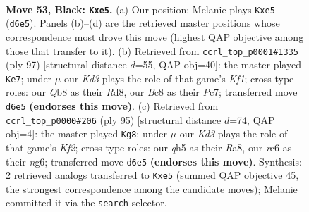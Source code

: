 \documentclass[11pt]{article}
\begin{document}
\clearpage

\begin{figure}[p]\centering
\begin{subfigure}{0.46\textwidth}\centering
\resizebox{\linewidth}{!}{%
\newchessgame
\chessboard[
  setfen={1qb5/r7/2Rkp3/p2pNpBQ/P6P/8/8/RN4K1 b - - 2 53},
  showmover=false,
  pgfstyle=straightmove, color=movearrow, markmove={d6-e5}
]}
\caption{}
\end{subfigure}\hfill
\begin{subfigure}{0.46\textwidth}\centering
\resizebox{\linewidth}{!}{%
\newchessgame
\chessboard[
  setfen={3r1k1R/2p2pp1/p3bNR1/4q3/1pP5/8/6K1/1BQ5 b - - 1 49},
  showmover=false,
  pgfstyle=straightmove, color=movearrow, markmove={f8-e7}
]}
\caption{}
\end{subfigure}
\\[4pt]
\begin{subfigure}{0.46\textwidth}\centering
\resizebox{\linewidth}{!}{%
\newchessgame
\chessboard[
  setfen={r7/2q2kp1/5pN1/4p2Q/1P5P/8/r4PPK/3R4 b - - 16 48},
  showmover=false,
  pgfstyle=straightmove, color=movearrow, markmove={f7-g8}
]}
\caption{}
\end{subfigure}\hfill

\caption{\textbf{Move 53, Black: \texttt{Kxe5}.} (a) Our position; Melanie plays \texttt{Kxe5} (\texttt{d6e5}). Panels (b)--(d) are the retrieved master positions whose correspondence most drove this move (highest QAP objective among those that transfer to it). (b) Retrieved from \texttt{ccrl\_top\_p0001\#1335} (ply 97) [structural distance $d$=55, QAP obj=40]: the master played \texttt{Ke7}; under $\mu$ our \emph{Kd3} plays the role of that game's \emph{Kf1}; cross-type roles: our \emph{Q}b8 as their \emph{R}d8, our \emph{B}c8 as their \emph{P}c7; transferred move \texttt{d6e5} \textbf{(endorses this move)}. (c) Retrieved from \texttt{ccrl\_top\_p0000\#206} (ply 95) [structural distance $d$=74, QAP obj=4]: the master played \texttt{Kg8}; under $\mu$ our \emph{Kd3} plays the role of that game's \emph{Kf2}; cross-type roles: our \emph{q}h5 as their \emph{R}a8, our \emph{r}c6 as their \emph{n}g6; transferred move \texttt{d6e5} \textbf{(endorses this move)}. Synthesis: 2 retrieved analogs transferred to \texttt{Kxe5} (summed QAP objective 45, the strongest correspondence among the candidate moves); Melanie committed it via the \texttt{search} selector.}
\label{fig:thought-m105}
\end{figure}

\clearpage
\end{document}
